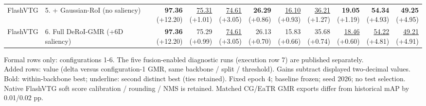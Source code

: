 \documentclass{article}
\begin{document}
{\begin{tabular}{llrrrrrrrrr}
FlashVTG & 5. + Gaussian-RoI (no saliency) & \shortstack{\textbf{97.36} \\ {\scriptsize (+12.20)}} & \shortstack{\underline{75.31} \\ {\scriptsize (+1.01)}} & \shortstack{\underline{74.61} \\ {\scriptsize (+3.05)}} & \shortstack{\textbf{26.29} \\ {\scriptsize (+0.86)}} & \shortstack{\underline{16.10} \\ {\scriptsize (+0.93)}} & \shortstack{\underline{36.21} \\ {\scriptsize (+1.27)}} & \shortstack{\textbf{19.05} \\ {\scriptsize (+1.19)}} & \shortstack{\textbf{54.34} \\ {\scriptsize (+4.93)}} & \shortstack{\textbf{49.25} \\ {\scriptsize (+4.95)}} \\
FlashVTG & 6. Full DeRoI-GMR (+6D saliency) & \shortstack{\textbf{97.36} \\ {\scriptsize (+12.20)}} & \shortstack{75.29 \\ {\scriptsize (+0.99)}} & \shortstack{\underline{74.61} \\ {\scriptsize (+3.05)}} & \shortstack{26.13 \\ {\scriptsize (+0.70)}} & \shortstack{15.83 \\ {\scriptsize (+0.66)}} & \shortstack{35.68 \\ {\scriptsize (+0.74)}} & \shortstack{\underline{18.46} \\ {\scriptsize (+0.60)}} & \shortstack{\underline{54.22} \\ {\scriptsize (+4.81)}} & \shortstack{\underline{49.21} \\ {\scriptsize (+4.91)}} \\
\bottomrule\end{tabular}}\par\medskip\footnotesize
Formal rows only: configurations 1-6. The five fusion-enabled diagnostic runs (execution row 7) are published separately.\\Added rows: value (delta versus configuration-1 GMR, same backbone / split / threshold). Gains subtract displayed two-decimal values.\\Bold: within-backbone best; underline: second distinct best (ties retained). Fixed epoch 4; baseline frozen; seed 2026; no test selection.\\Native FlashVTG soft score calibration / rounding / NMS is retained. Matched CG/EaTR GMR exports differ from historical mAP by 0.01/0.02 pp.
\end{document}

